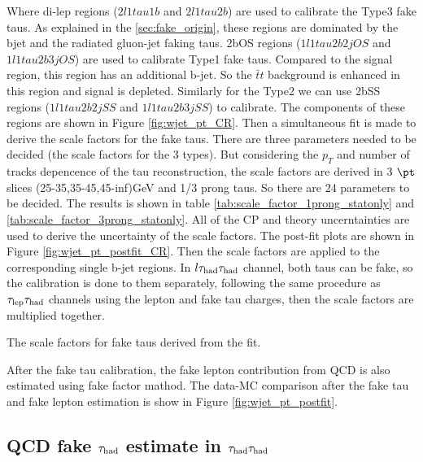 Where di-lep regions ($2l1tau1b$ and $2l1tau2b$) are used to calibrate the Type3 fake taus. As explained in the \ref{sec:fake_origin}, these regions are dominated by the bjet and the radiated gluon-jet faking taus. 2bOS regions ($1l1tau2b2j OS$ and $1l1tau2b3j OS$) are used to calibrate Type1 fake taus. Compared to the signal region, this region has an additional b-jet. So the $\bar{t}t$ background is enhanced in this region and signal is depleted. Similarly for the Type2 we can use 2bSS regions ($1l1tau2b2j SS$ and $1l1tau2b3j SS$) to calibrate. The components of these regions are shown in Figure \ref{fig:wjet_pt_CR}. Then a simultaneous fit is made to derive the scale factors for the fake taus. There are three parameters needed to be decided (the scale factors for the 3 types). But considering the $p_{T}$ and number of tracks depencence of the tau reconstruction, the scale factors are derived in 3 $\pt$ slices (25-35,35-45,45-inf)GeV and 1/3 prong taus. So there are 24 parameters to be decided. The results is shown in table \ref{tab:scale_factor_1prong_statonly} and \ref{tab:scale_factor_3prong_statonly}. All of the CP and theory uncerntainties are used to derive the uncertainty of the scale factors. The post-fit plots are shown in Figure \ref{fig:wjet_pt_postfit_CR}. Then the scale factors are applied to the corresponding single b-jet regions. In $l\tau_\text{had}{}\tau_\text{had}$ channel, both taus can be fake, so the calibration is done to them separately, following the same procedure as $\tau_\text{lep}{}\tau_\text{had}$ channels using the lepton and fake tau charges, then the scale factors are multiplied together.


\begin{table}
\caption{The scale factors for fake taus derived from the fit.}


\end{table}






After the fake tau calibration, the fake lepton contribution from QCD is also estimated using fake factor mathod. The data-MC comparison after the fake tau and fake lepton estimation is show in Figure \ref{fig:wjet_pt_postfit}.

\subsection{QCD fake $\tau_\text{had}$ estimate in $\tau_\text{had}{}\tau_\text{had}$}
\label{sec:ss_method}


